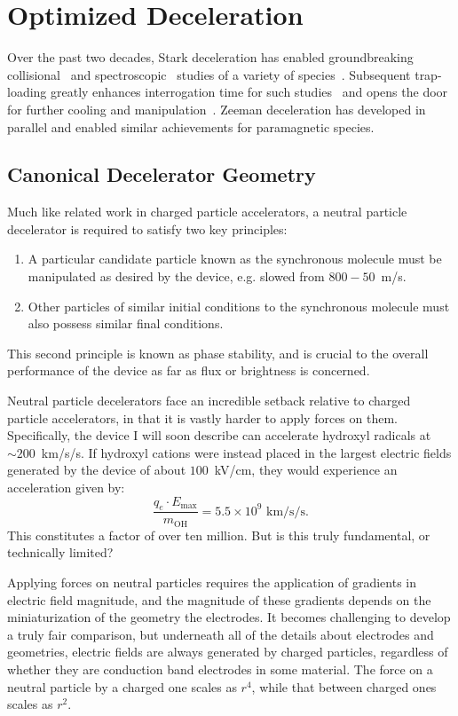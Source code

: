 \chapter{Optimized Deceleration}

Over the past two decades, Stark deceleration has enabled groundbreaking collisional~\cite{Sawyer2011,Kirste2012,Gao2018} and spectroscopic~\cite{Veldhoven2004,Hudson2006,Lev2006,Fast2018} studies of a variety of species~\cite{VanDeMeerakker2012}. 
Subsequent trap-loading greatly enhances interrogation time for such studies~\cite{Sawyer2008} and opens the door for further cooling and manipulation~\cite{Stuhl2012evap, Reens2017}. 
Zeeman deceleration has developed in parallel and enabled similar achievements for paramagnetic species. 


\section{Canonical Decelerator Geometry}

Much like related work in charged particle accelerators, a neutral particle decelerator is required to satisfy two key principles:
\begin{enumerate}
\item A particular candidate particle known as the synchronous molecule must be manipulated as desired by the device, e.g. slowed from $800-50$~m/s.
\item Other particles of similar initial conditions to the synchronous molecule must also possess similar final conditions.
\end{enumerate}
This second principle is known as phase stability, and is crucial to the overall performance of the device as far as flux or brightness is concerned.

Neutral particle decelerators face an incredible setback relative to charged particle accelerators, in that it is vastly harder to apply forces on them.
Specifically, the device I will soon describe can accelerate hydroxyl radicals at $\sim 200$~km/s/s. 
If hydroxyl cations were instead placed in the largest electric fields generated by the device of about $100$~kV/cm, they would experience an acceleration given by:
\begin{equation}
\frac{q_e\cdot E_\text{max} }{m_\text{OH}} = 5.5\times 10^9\text{ km/s/s}.
\end{equation}
This constitutes a factor of over ten million. 
But is this truly fundamental, or technically limited? 

Applying forces on neutral particles requires the application of gradients in electric field magnitude, and the magnitude of these gradients depends on the miniaturization of the geometry the electrodes.
It becomes challenging to develop a truly fair comparison, but underneath all of the details about electrodes and geometries, electric fields are always generated by charged particles, regardless of whether they are conduction band electrodes in some material.
The force on a neutral particle by a charged one scales as $r^4$, while that between charged ones scales as $r^2$.

